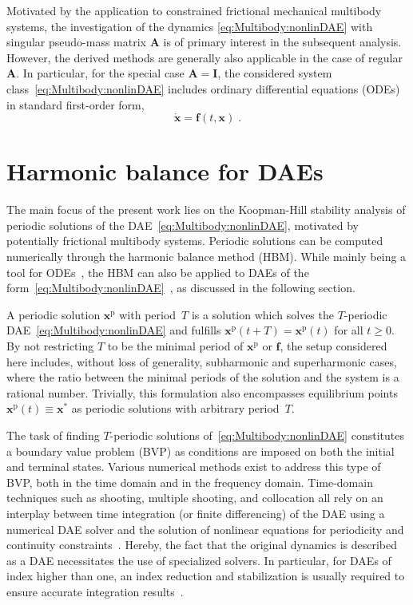 \documentclass[a4paper, nonatbib, 3p, twocolumn]{elsarticle}
\theoremstyle{plain}
\theoremstyle{definition}
\theoremstyle{remark}
\newcommand{\rp}{\mathrm p}
\newcommand{\vf}{\mathbf f}
\newcommand{\vx}{\mathbf x}
\newcommand{\vA}{\mathbf A}
\newcommand{\vI}{\mathbf I}
\begin{document}
Motivated by the application to constrained frictional mechanical multibody systems, the investigation of the dynamics \eqref{eq:Multibody:nonlinDAE} with singular pseudo-mass matrix $\vA$ is of primary interest in the subsequent analysis.
However, the derived methods are generally also applicable in the case of regular $\vA$.
In particular, for the special case $\vA=\vI$, the considered system class~\eqref{eq:Multibody:nonlinDAE} includes ordinary differential equations (ODEs) in standard first-order form,
\begin{equation}\label{eq:Multibody:nonlinODE}
    \dot{\vx} = \vf(t, \vx)\;.
\end{equation}

\section{Harmonic balance for DAEs}\label{ch:HBM}
The main focus of the present work lies on the Koopman-Hill stability analysis of periodic solutions of the DAE~\eqref{eq:Multibody:nonlinDAE}, motivated by potentially frictional multibody systems.
Periodic solutions can be computed numerically through the harmonic balance method (HBM). While mainly being a tool for ODEs~\cite{Krack2019,Nayfeh1995}, the HBM can also be applied to DAEs of the form~\eqref{eq:Multibody:nonlinDAE}~\cite{Legrand2024}, as discussed in the following section.




A periodic solution $\vx^{\rp}$ with period~$T$ is a solution which solves the $T$-periodic DAE~\eqref{eq:Multibody:nonlinDAE} and  fulfills $\vx^\rp(t + T) = \vx^\rp(t)$ for all $t \geq 0$. 
By not restricting $T$ to be the minimal period of $\vx^{\rp}$ or $\vf$, the setup considered here includes, without loss of generality, subharmonic and superharmonic cases, where the ratio between the minimal periods of the solution and the system is a rational number. 
Trivially, this formulation also encompasses equilibrium points $\vx^{\rp}(t) \equiv \vx^* $ as periodic solutions with arbitrary period~$T$.

The task of finding $T$-periodic solutions of~\eqref{eq:Multibody:nonlinDAE} constitutes a boundary value problem (BVP)
as conditions are imposed on both the initial and terminal states. 
Various numerical methods exist to address this type of BVP, both in the time domain and in the frequency domain. 
Time-domain techniques such as shooting, multiple shooting, and collocation all rely on an interplay between time integration (or finite differencing) of the DAE using a numerical DAE solver and the solution of nonlinear equations for periodicity and continuity constraints~\cite{Brenan1995}. Hereby, the fact that the original dynamics is described as a DAE necessitates the use of specialized solvers. In particular, for DAEs of index higher than one, an index reduction and stabilization is usually required to ensure accurate integration results~\cite{Gear1985, Anantharaman1991}. 
\end{document}
